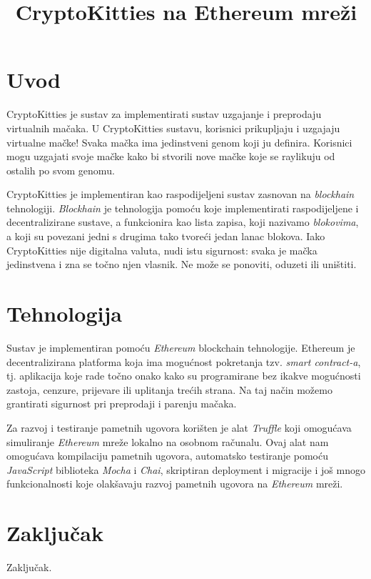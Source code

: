 \documentclass[times, utf8, tehnicka_dokumentacija]{fer}
\def \naslov {CryptoKitties na Ethereum mreži}
\def \ver {1.0}
\def \broj {4}
\def \mentor {Federico Matteo Benčić}
\begin{document}
\title{\naslov}
\verzija{\ver}
\author{\tim}
\size{\broj}
\voditelj{\mentor}

\maketitle
\tableofcontents

\chapter{Uvod}
CryptoKitties je sustav za implementirati sustav uzgajanje i preprodaju virtualnih mačaka. U CryptoKitties sustavu, korisnici prikupljaju i uzgajaju virtualne mačke! Svaka mačka ima jedinstveni genom koji ju definira. Korisnici mogu uzgajati svoje mačke kako bi stvorili nove mačke koje se raylikuju od ostalih po svom genomu.

CryptoKitties je implementiran kao raspodijeljeni sustav zasnovan na {\it blockhain} tehnologiji. {\it Blockhain} je tehnologija pomoću koje implementirati raspodijeljene i decentralizirane sustave, a funkcionira kao lista zapisa, koji nazivamo {\it blokovima}, a koji su povezani jedni s drugima tako tvoreći jedan lanac blokova. Iako CryptoKitties nije digitalna valuta, nudi istu sigurnost: svaka je mačka jedinstvena i zna se točno njen vlasnik. Ne može se ponoviti, oduzeti ili uništiti.

\chapter{Tehnologija}
Sustav je implementiran pomoću {\it Ethereum} blockchain tehnologije. Ethereum je decentralizirana platforma koja ima mogućnost pokretanja tzv. {\it smart contract-a}, tj. aplikacija koje rade točno onako kako su programirane bez ikakve mogućnosti zastoja, cenzure, prijevare ili uplitanja trećih strana. Na taj način možemo grantirati sigurnost pri preprodaji i parenju mačaka.

Za razvoj i testiranje pametnih ugovora korišten je alat {\it Truffle} koji omogućava simuliranje {\it Ethereum} mreže lokalno na osobnom računalu. Ovaj alat nam omogućava kompilaciju pametnih ugovora, automatsko testiranje pomoću {\it JavaScript} biblioteka {\it Mocha} i {\it Chai}, skriptiran deployment i migracije i još mnogo funkcionalnosti koje olakšavaju razvoj pametnih ugovora na {\it Ethereum} mreži.

\chapter{Zaključak}
Zaključak.



\end{document}
